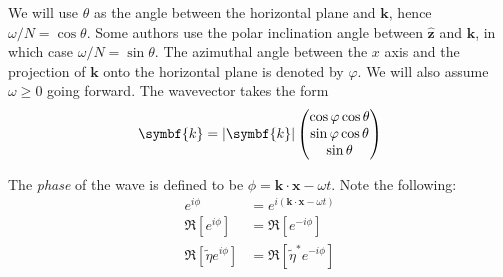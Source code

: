 \documentclass{jknotes}
\begin{document}
We will use $\theta$ as the angle between the horizontal plane and
$\symbf{k}$, hence $\omega/N = \cos \theta$. Some authors use the polar
inclination angle between $\hat{\symbf{z}}$ and $\symbf{k}$, in which case
$\omega/N = \sin\theta$. The azimuthal angle between the $x$ axis and the
projection of $\symbf{k}$ onto the horizontal plane is denoted by $\varphi$.
We will also assume $\omega \ge 0$ going forward. The wavevector takes the
form
\begin{equation}
	\symbf{k} = \abs{\symbf{k}} \begin{pmatrix} \cos\varphi\cos\theta \\
	\sin\varphi\cos\theta \\ \sin \theta \end{pmatrix}
\end{equation}

The \emph{phase} of the wave is defined to be $\phi = \symbf{k}\cdot\symbf{x}
- \omega t$. Note the following:
\begin{align}
	e^{i\phi} &= e^{i(\symbf{k}\cdot\symbf{x}-\omega t)} \\
	\Re\left[ e^{i\phi}\right] &= \Re\left[ e^{-i\phi}\right] \\
	\Re\left[ \tilde{\eta}e^{i\phi}\right] &= \Re\left[\tilde{\eta}^*
	e^{-i\phi}\right]
\end{align}
\end{document}
